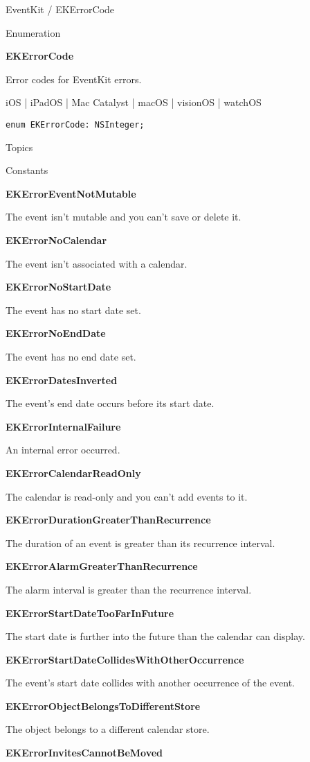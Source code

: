 \documentclass{article}
\title{}
\author{}
\date{}
\begin{document}
EventKit / EKErrorCode

Enumeration

\textbf{EKErrorCode}

Error codes for EventKit errors.

iOS | iPadOS | Mac Catalyst | macOS | visionOS | watchOS

\texttt{enum EKErrorCode: NSInteger;}

Topics

Constants

\textbf{EKErrorEventNotMutable}

The event isn't mutable and you can't save or delete it.

\textbf{EKErrorNoCalendar}

The event isn't associated with a calendar.

\textbf{EKErrorNoStartDate}

The event has no start date set.

\textbf{EKErrorNoEndDate}

The event has no end date set.

\textbf{EKErrorDatesInverted}

The event's end date occurs before its start date.

\textbf{EKErrorInternalFailure}

An internal error occurred.

\textbf{EKErrorCalendarReadOnly}

The calendar is read-only and you can't add events to it.

\textbf{EKErrorDurationGreaterThanRecurrence}

The duration of an event is greater than its recurrence interval.

\textbf{EKErrorAlarmGreaterThanRecurrence}

The alarm interval is greater than the recurrence interval.

\textbf{EKErrorStartDateTooFarInFuture}

The start date is further into the future than the calendar can display.

\textbf{EKErrorStartDateCollidesWithOtherOccurrence}

The event's start date collides with another occurrence of the event.

\textbf{EKErrorObjectBelongsToDifferentStore}

The object belongs to a different calendar store.

\textbf{EKErrorInvitesCannotBeMoved}
\end{document}
